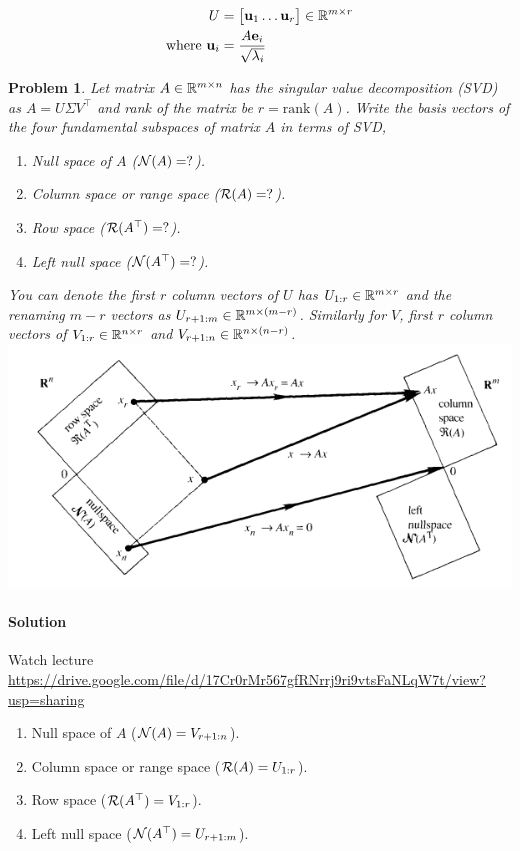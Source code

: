 \documentclass{article}
\newtheorem{prob}{Problem}
\begin{document}
\begin{align}
  U &= \begin{bmatrix} \mathbf{u}_1 \dots \mathbf{u}_r \end{bmatrix} \in \mathbb{R}^{m \times r}
  \\
  \text{where } \mathbf{u}_i &= \frac{A\mathbf{e}_i}{\sqrt{\lambda_i}}
\end{align}
\newpage

\begin{prob}
  Let matrix $A \in \mathbb{R}^{m \times n}$ has the singular value decomposition
  (SVD) as $A = U\Sigma V^\top$ and rank of the matrix be $r = \text{rank}(A)$.
  Write the basis vectors of the four fundamental subspaces of matrix $A$ in
terms of SVD,
  \begin{enumerate}
    \item Null space of $A$ (${\cal N}(A) = ?$).
    \item Column space or range space (${\cal R}(A) = ?$).
    \item Row space (${\cal R}(A^\top) = ?$).
    \item Left null space (${\cal N}(A^\top) = ?$).
  \end{enumerate}
  You can denote the first $r$ column vectors of $U$ has $U_{1:r} \in \mathbb{R}^{m
    \times r}$ and the
  renaming $m-r$ vectors as $U_{r+1:m} \in \mathbb{R}^{m \times (m-r)}$. Similarly for
$V$, first $r$ column vectors of $V_{1:r} \in \mathbb{R}^{n \times r}$ and $V_{r+1:n}
\in \mathbb{R}^{n \times (n-r)}$.
\\
\includegraphics[width=0.7\linewidth]{media/four-fundamental-subspaces.png}
\end{prob}
\newpage
\paragraph*{Solution}
Watch lecture \url{https://drive.google.com/file/d/17Cr0rMr567gfRNrrj9ri9vtsFaNLqW7t/view?usp=sharing}

\begin{enumerate}
\item Null space of $A$ (${\cal N}(A) = V_{r+1:n}$).
\item Column space or range space (${\cal R}(A) = U_{1:r}$).
\item Row space (${\cal R}(A^\top) = V_{1:r}$).
\item Left null space (${\cal N}(A^\top) = U_{r+1:m}$).
\end{enumerate}
\end{document}
